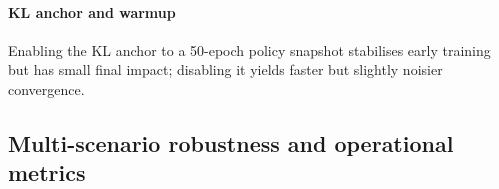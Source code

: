 \begin{table}[t]
\centering
\small
\caption{Group E: Data-efficiency. Cumulative SUMO reward (K) vs offline buffer size, 5 seeds each. H2O+ reaches with 200K what pure offline never reaches with 675K. The H2O+ column uses the \texttt{sim\_is\_calql} configuration (Contrastive + Q-floor) for historical reasons --- this sweep predates the SIM-online ablation that identified the Contrastive-only variant as the deployment-best (). The data-efficiency \emph{ratio} (H2O+ at 200K matching pure offline at 675K) is robust to recipe choice within the H2O+ family.}
\label{tab:data_size}
\end{table}

\paragraph{KL anchor and warmup}
Enabling the KL anchor to a 50-epoch policy snapshot \citep{zhou2024wsrl} stabilises early training but has small final impact; disabling it yields faster but slightly noisier convergence.

\subsection{Multi-scenario robustness and operational metrics}
\label{sec:exp:multiseed}

